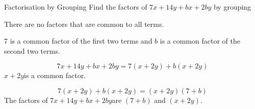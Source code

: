  \begin{wex}{Factorisation by Grouping }{Find the factors of $7x+14y+bx+2by$ by grouping}
{
   
     \westep{} \label{m39394*id278713}There are no factors that are common to all terms.\par 
        
\westep{}      \label{m39394*id278721}7 is a common factor of the first two terms and $b$ is a common factor of the second two terms.\par 
   \westep{}    
      \label{m39394*id278739}\nopagebreak\noindent{}
        
    \begin{equation}
    7x+14y+bx+2by=7\left(x+2y\right)+b\left(x+2y\right)      \end{equation}
      \westep{}
      \label{m39394*id278811}$x+2y$\hspace{1ex}is a common factor.\par 
  \westep{}  
      \label{m39394*id278835}\nopagebreak\noindent{}
        
    \begin{equation}
    7\left(x+2y\right)+b\left(x+2y\right)=\left(x+2y\right)\left(7+b\right)
      \end{equation}
      \westep{}  
      \label{m39394*id278906}The factors of $7x+14y+bx+2by$\hspace{1ex}are $\left(7+b\right)$ and $\left(x+2y\right)$.
 \par 
}
    \end{wex}

